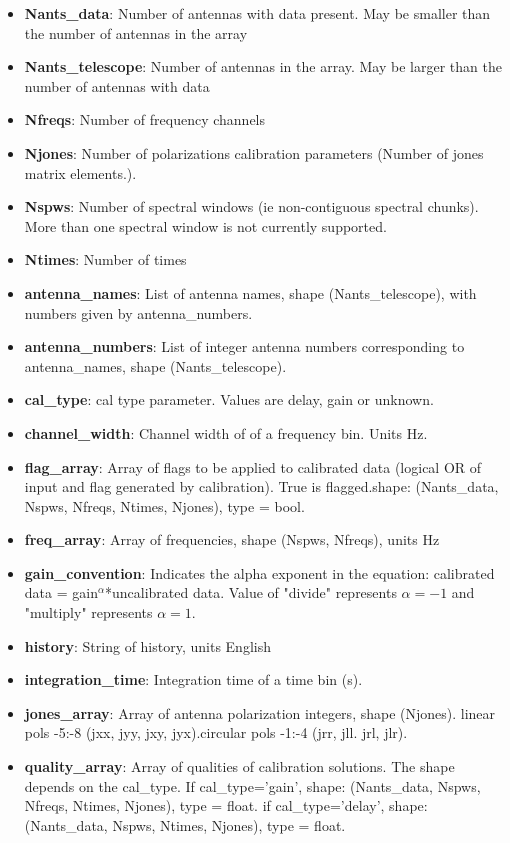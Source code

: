\documentclass[11pt, oneside]{article}   	%
\begin{document}
\begin{itemize}
	\item{\textbf{Nants\_data}: Number of antennas with data present. May be smaller than the number of antennas in the array}
	\item{\textbf{Nants\_telescope}: Number of antennas in the array. May be larger than the number of antennas with data}
	\item{\textbf{Nfreqs}: Number of frequency channels}
	\item{\textbf{Njones}: Number of polarizations calibration parameters (Number of jones matrix elements.).}
	\item{\textbf{Nspws}: Number of spectral windows (ie non-contiguous spectral chunks). More than one spectral window is not currently supported.}
	\item{\textbf{Ntimes}: Number of times}
	\item{\textbf{antenna\_names}: List of antenna names, shape (Nants\_telescope), with numbers given by antenna\_numbers.}
	\item{\textbf{antenna\_numbers}: List of integer antenna numbers corresponding to antenna\_names, shape (Nants\_telescope).}
	\item{\textbf{cal\_type}: cal type parameter. Values are delay, gain or unknown.}
	\item{\textbf{channel\_width}: Channel width of of a frequency bin. Units Hz.}
	\item{\textbf{flag\_array}: Array of flags to be applied to calibrated data (logical OR of input and flag generated by calibration). True is flagged.shape: (Nants\_data, Nspws, Nfreqs, Ntimes, Njones), type = bool.}
	\item{\textbf{freq\_array}: Array of frequencies, shape (Nspws, Nfreqs), units Hz}
	\item{\textbf{gain\_convention}: Indicates the alpha exponent in the equation: calibrated data = gain$^{\alpha}$*uncalibrated data. Value of "divide" represents $\alpha=-1$ and "multiply" represents $\alpha=1$.}
	\item{\textbf{history}: String of history, units English}
	\item{\textbf{integration\_time}:  Integration time of a time bin (s).}
	\item{\textbf{jones\_array}:  Array of antenna polarization integers, shape (Njones). linear pols -5:-8 (jxx, jyy, jxy, jyx).circular pols -1:-4 (jrr, jll. jrl, jlr).}
	\item{\textbf{quality\_array}:  Array of qualities of calibration solutions. The shape depends on the cal\_type. If cal\_type='gain', shape: (Nants\_data, Nspws, Nfreqs, Ntimes, Njones), type = float. if cal\_type='delay', shape: (Nants\_data, Nspws, Ntimes, Njones), type = float.}

\end{itemize}
\end{document}
